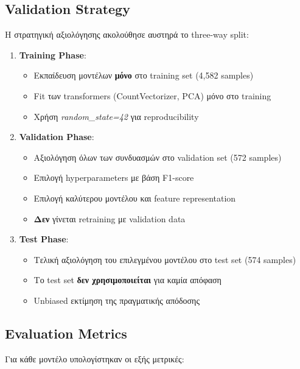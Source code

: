 \documentclass[12pt,a4paper,twoside]{book}
\begin{document}
\subsection{Validation Strategy}

Η στρατηγική αξιολόγησης ακολούθησε αυστηρά το three-way split:

\begin{enumerate}
    \item \textbf{Training Phase}:
          \begin{itemize}
              \item Εκπαίδευση μοντέλων \textbf{μόνο} στο training set (4,582 samples)
              \item Fit των transformers (CountVectorizer, PCA) μόνο στο training
              \item Χρήση \textit{random\_state=42} για reproducibility
          \end{itemize}

    \item \textbf{Validation Phase}:
          \begin{itemize}
              \item Αξιολόγηση όλων των συνδυασμών στο validation set (572 samples)
              \item Επιλογή hyperparameters με βάση F1-score
              \item Επιλογή καλύτερου μοντέλου και feature representation
              \item \textbf{Δεν} γίνεται retraining με validation data
          \end{itemize}

    \item \textbf{Test Phase}:
          \begin{itemize}
              \item Τελική αξιολόγηση του επιλεγμένου μοντέλου στο test set (574 samples)
              \item Το test set \textbf{δεν χρησιμοποιείται} για καμία απόφαση
              \item Unbiased εκτίμηση της πραγματικής απόδοσης
          \end{itemize}
\end{enumerate}

\subsection{Evaluation Metrics}

Για κάθε μοντέλο υπολογίστηκαν οι εξής μετρικές:
\end{document}
